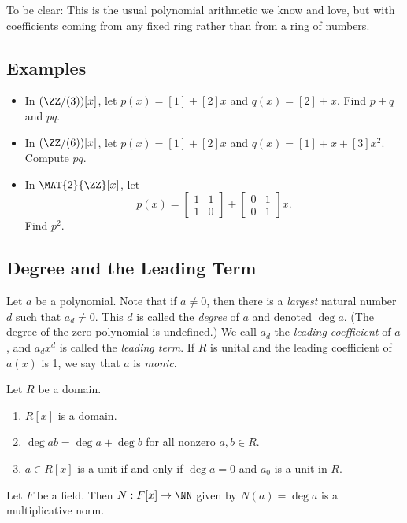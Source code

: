 \documentclass{article}
\begin{document}
To be clear: This is the usual polynomial arithmetic we know and love, but with coefficients coming from any fixed ring rather than from a ring of numbers.

\subsection*{Examples}

\begin{itemize}
\item In $(\ZZ/(3))[x]$, let $p(x) = [1] + [2]x$ and $q(x) = [2] + x$. Find $p+q$ and $pq$.
\item In $(\ZZ/(6))[x]$, let $p(x) = [1] + [2]x$ and $q(x) = [1] + x + [3]x^2$. Compute $pq$.\item In $\MAT{2}{\ZZ}[x]$, let \[ p(x) = \begin{bmatrix} 1 & 1 \\ 1 & 0 \end{bmatrix} + \begin{bmatrix} 0 & 1 \\ 0 & 1 \end{bmatrix} x. \] Find $p^2$.
\end{itemize}

\subsection*{Degree and the Leading Term}

Let $a$ be a polynomial. Note that if $a \neq 0$, then there is a \emph{largest} natural number $d$ such that $a_d \neq 0$. This $d$ is called the \emph{degree} of $a$ and denoted $\deg{a}$. (The degree of the zero polynomial is undefined.) We call $a_d$ the \emph{leading coefficient} of $a$, and $a_d x^d$ is called the \emph{leading term}. If $R$ is unital and the leading coefficient of $a(x)$ is 1, we say that $a$ is \emph{monic}.

\begin{prop}
Let $R$ be a domain.
\begin{enumerate}
\item $R[x]$ is a domain.
\item $\deg{ab} = \deg{a} + \deg{b}$ for all nonzero $a,b \in R$.
\item $a \in R[x]$ is a unit if and only if $\deg{a} = 0$ and $a_0$ is a unit in $R$.
\end{enumerate}
\end{prop}

\begin{cor}
Let $F$ be a field. Then $N : F[x] \rightarrow \NN$ given by $N(a) = \deg{a}$ is a multiplicative norm.
\end{cor}
\end{document}
